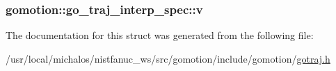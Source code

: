 \hypertarget{structgomotion_1_1go__traj__interp__spec_a839cd0bd8c7e4d2aef854d3b2aefd65d}{
\subsubsection[{v}]{ gomotion\-::go\-\_\-traj\-\_\-interp\-\_\-spec\-::v}}\label{structgomotion_1_1go__traj__interp__spec_a839cd0bd8c7e4d2aef854d3b2aefd65d}


The documentation for this struct was generated from the following file\-:\begin{DoxyCompactItemize}
\item 
/usr/local/michalos/nistfanuc\-\_\-ws/src/gomotion/include/gomotion/\hyperlink{gotraj_8h}{gotraj.\-h}\end{DoxyCompactItemize}
